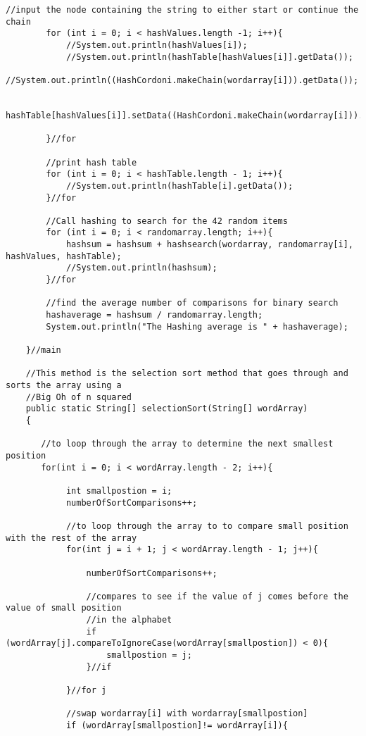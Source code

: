 \documentclass[letterpaper, 10pt,DIV=13]{scrartcl}
\numberwithin{equation}{section} %
\numberwithin{figure}{section} %
\numberwithin{table}{section} %
\begin{document}
\begin{lstlisting}[frame=single, ]
        //input the node containing the string to either start or continue the chain
        for (int i = 0; i < hashValues.length -1; i++){
            //System.out.println(hashValues[i]);
            //System.out.println(hashTable[hashValues[i]].getData());
            //System.out.println((HashCordoni.makeChain(wordarray[i])).getData());
            
            hashTable[hashValues[i]].setData((HashCordoni.makeChain(wordarray[i])).getData());
  
        }//for

        //print hash table
        for (int i = 0; i < hashTable.length - 1; i++){
            //System.out.println(hashTable[i].getData());
        }//for

        //Call hashing to search for the 42 random items
        for (int i = 0; i < randomarray.length; i++){
            hashsum = hashsum + hashsearch(wordarray, randomarray[i], hashValues, hashTable);
            //System.out.println(hashsum);
        }//for

        //find the average number of comparisons for binary search
        hashaverage = hashsum / randomarray.length;
        System.out.println("The Hashing average is " + hashaverage);
       
    }//main

    //This method is the selection sort method that goes through and sorts the array using a 
    //Big Oh of n squared
    public static String[] selectionSort(String[] wordArray)
    {

       //to loop through the array to determine the next smallest position
       for(int i = 0; i < wordArray.length - 2; i++){

            int smallpostion = i;
            numberOfSortComparisons++;

            //to loop through the array to to compare small position with the rest of the array
            for(int j = i + 1; j < wordArray.length - 1; j++){

                numberOfSortComparisons++;

                //compares to see if the value of j comes before the value of small position 
                //in the alphabet
                if (wordArray[j].compareToIgnoreCase(wordArray[smallpostion]) < 0){
                    smallpostion = j;
                }//if

            }//for j

            //swap wordarray[i] with wordarray[smallpostion]
            if (wordArray[smallpostion]!= wordArray[i]){
                

\end{lstlisting}
\end{document}

